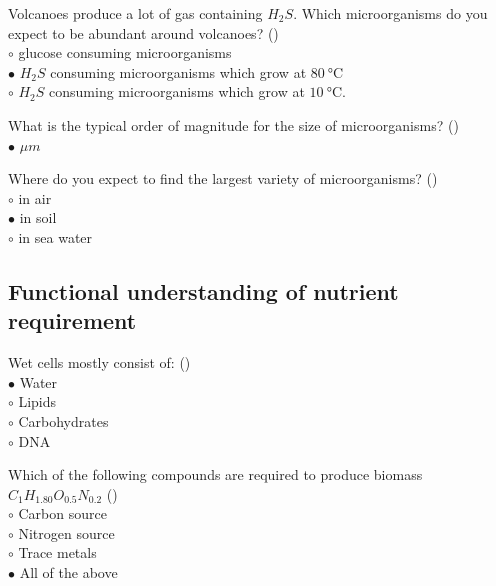 \documentclass[]{beamer}
\begin{document}
\begin{frame}[shrink] {}
\addtocounter{questions}{1}
\color{blue}
Volcanoes produce a lot of gas containing $H_2S$. Which microorganisms do
you expect to be abundant around volcanoes? ()\\
\color{black}
\setlength{\parindent}{-0.4cm}
{\color{red}$\circ$} glucose consuming microorganisms\\
{\color{red}$\bullet$} $H_2S$ consuming microorganisms which grow at $\SI{80}{\degreeCelsius}$\\
{\color{red}$\circ$} $H_2S$ consuming microorganisms which grow at $\SI{10}{\degreeCelsius}$. 
\end{frame}
\begin{frame}[shrink] {}
\addtocounter{questions}{1}
\color{blue}
What is the typical order of magnitude for the size of microorganisms? ()\\
\color{black}
\setlength{\parindent}{-0.4cm}
{\color{red}$\bullet$} ${\mu}m$
\end{frame}
\begin{frame}[shrink] {}
\addtocounter{questions}{1}
\color{blue}
Where do you expect to find the largest variety of microorganisms? ()\\
\color{black}
\setlength{\parindent}{-0.4cm}
{\color{red}$\circ$} in air\\
{\color{red}$\bullet$} in soil\\
{\color{red}$\circ$} in sea water\\
\end{frame}
\subsection{Functional understanding of nutrient requirement}
\setcounter{questions}{0}
\begin{frame}[shrink] {}
\addtocounter{questions}{1}
\color{blue}
Wet cells mostly consist of: ()\\
\color{black}
\setlength{\parindent}{-0.4cm}
{\color{red}$\bullet$} Water\\ 
{\color{red}$\circ$} Lipids\\
{\color{red}$\circ$} Carbohydrates\\
{\color{red}$\circ$} DNA \\
\end{frame}
\begin{frame}[shrink] {}
\addtocounter{questions}{1}
\color{blue}
Which of the following compounds are required to produce biomass $C_1H_{1.80}O_{0.5}N_{0.2}$ ()\\
\color{black}
\setlength{\parindent}{-0.4cm}
{\color{red}$\circ$}  Carbon source\\
{\color{red}$\circ$} Nitrogen source\\
{\color{red}$\circ$} Trace metals\\
{\color{red}$\bullet$} All of the above \\
\end{frame}
\end{document}
